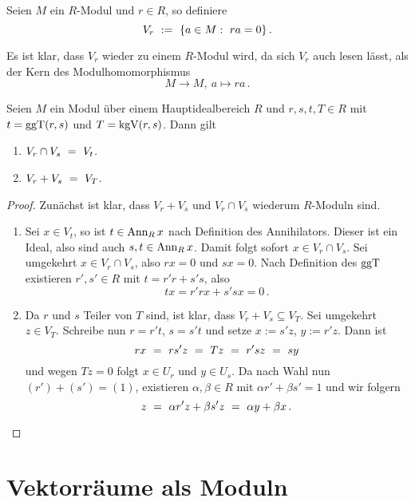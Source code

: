 \begin{definition}
  Seien $M$ ein $R$-Modul und $r \in R$, so definiere
  \[ V_r \ :=\  \{ a\in M:\ ra = 0\}\,.\]
\end{definition}


\begin{bemerkung}
  Es ist klar, dass $V_r$ wieder zu einem $R$-Modul wird, da sich $V_r$ auch
  lesen lässt, als der Kern des Modulhomomorphismus
  \[ M\to M,\ a \mapsto ra\,.\]
\end{bemerkung}

\begin{satz}
  \label{satz:schnitt_plus_vs}
  Seien $M$ ein Modul über einem Hauptidealbereich $R$ und $r,s,t,T\in R$ mit 
  $t = \operatorname{ggT}(r,s)$ und $T = \operatorname{kgV}(r,s)$. Dann gilt
  \begin{enumerate}
    \item $V_r \cap V_s \ =\  V_t$.
    \item $V_r + V_s \ =\  V_T$.
  \end{enumerate}
\end{satz}
\begin{proof}
  Zunächst ist klar, dass $V_r+V_s$ und $V_r\cap V_s$ wiederum $R$-Moduln sind.
  \begin{enumerate}
    \item Sei $x\in V_t$, so ist $t \in \operatorname{Ann}_Rx$ nach Definition des
      Annihilators. Dieser ist ein Ideal, also sind auch $s,t\in \operatorname{Ann}_Rx$.
      Damit folgt sofort $x \in V_r\cap V_s$.
      Sei umgekehrt $x \in V_r \cap V_s$, also $rx = 0$ und $sx = 0$. 
      Nach Definition des $\operatorname{ggT}$ existieren $r',s'\in R$ mit 
      $t = r'r + s's$, also 
      \[ tx = r'rx + s'sx = 0\,.\]
    \item Da $r$ und $s$ Teiler von $T$ sind, ist klar, dass
      $V_r+V_s \subseteq V_T$. Sei umgekehrt $z\in V_T$.
      Schreibe nun $r = r't$, $s = s't$ und setze
      $x := s'z$, $y:=r'z$. Dann ist 
      \[ rx \ =\  rs'z \ =\  Tz \ =\  r'sz \ =\  sy \]
      und wegen $Tz = 0$ folgt $x\in U_r$ und $y \in U_s$. Da nach Wahl nun
      $(r')+(s') = (1)$, existieren $\alpha,\beta\in R$ mit 
      $\alpha r' + \beta s' = 1$ und wir folgern
      \[ z \ =\  \alpha r'z + \beta s'z \ =\  \alpha y + \beta x \,.\]
  \end{enumerate}
\end{proof}


\section{Vektorräume als Moduln}

